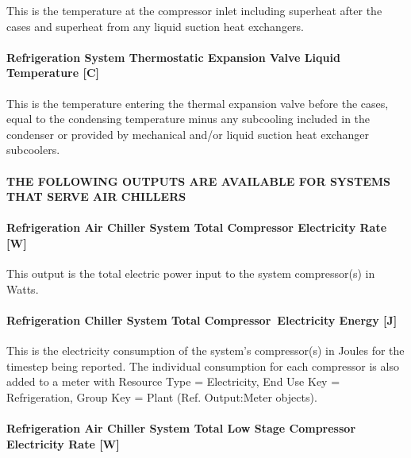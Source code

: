 This is the temperature at the compressor inlet including superheat after the cases and superheat from any liquid suction heat exchangers.

\paragraph{Refrigeration System Thermostatic Expansion Valve Liquid Temperature {[}C{]}}\label{refrigeration-system-thermostatic-expansion-valve-liquid-temperature-c}

This is the temperature entering the thermal expansion valve before the cases, equal to the condensing temperature minus any subcooling included in the condenser or provided by mechanical and/or liquid suction heat exchanger subcoolers.

\paragraph{THE FOLLOWING OUTPUTS ARE AVAILABLE FOR SYSTEMS THAT SERVE AIR CHILLERS}\label{the-following-outputs-are-available-for-systems-that-serve-air-chillers}

\paragraph{Refrigeration Air Chiller System Total Compressor Electricity Rate {[}W{]}}\label{refrigeration-air-chiller-system-total-compressor-electric-power-w}

This output is the total electric power input to the system compressor(s) in Watts.

\paragraph{Refrigeration Chiller System Total Compressor~Electricity Energy {[}J{]}}\label{refrigeration-chiller-system-total-compressorelectric-energy-j}

This is the electricity consumption of the system's compressor(s) in Joules for the timestep being reported. The individual consumption for each compressor is also added to a meter with Resource Type = Electricity, End Use Key = Refrigeration, Group Key = Plant (Ref. Output:Meter objects).

\paragraph{Refrigeration Air Chiller System Total Low Stage Compressor Electricity Rate {[}W{]}}\label{refrigeration-air-chiller-system-total-low-stage-compressor-electric-power-w}

